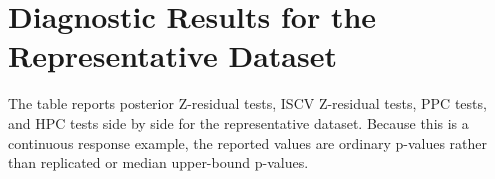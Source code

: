 \documentclass[
  english,
  letterpaper,
  DIV=11,
  numbers=noendperiod]{scrartcl}
\newenvironment{Shaded}{\begin{snugshade}}{\end{snugshade}}
\newcommand{\FunctionTok}[1]{\textcolor[rgb]{0.28,0.35,0.67}{#1}}
\newcommand{\NormalTok}[1]{\textcolor[rgb]{0.00,0.23,0.31}{#1}}
\newcommand{\OtherTok}[1]{\textcolor[rgb]{0.00,0.23,0.31}{#1}}
\newcommand{\SpecialCharTok}[1]{\textcolor[rgb]{0.37,0.37,0.37}{#1}}
\begin{document}
\begin{Shaded}
\end{Shaded}

\section{Diagnostic Results for the Representative
Dataset}\label{diagnostic-results-for-the-representative-dataset}

The table reports posterior Z-residual tests, ISCV Z-residual tests, PPC
tests, and HPC tests side by side for the representative dataset.
Because this is a continuous response example, the reported values are
ordinary p-values rather than replicated or median upper-bound p-values.
\end{document}
